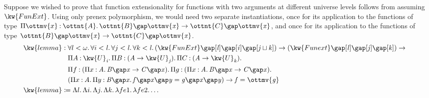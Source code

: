 \documentclass[a4paper,UKenglish,cleveref,autoref,thm-restate]{lipics-v2021}
\begin{document}
Suppose we wished to prove that function extensionality for
functions with two arguments at different universe levels follows from assuming $ \kw{ FunExt } $.
Using only prenex polymorphism, we would need two separate instantiations,
once for its application to the functions of type $ \Pi  \ottmv{x}  \mathbin{:}  \ottnt{A}  \mathpunct{.}     \ottnt{B}  \gap   \mathit{ \ottmv{x} }    \to  \ottnt{C}   \gap   \mathit{ \ottmv{x} }   $,
and once for its application to the functions of type $   \ottnt{B}  \gap   \mathit{ \ottmv{x} }    \to  \ottnt{C}   \gap   \mathit{ \ottmv{x} }  $.
%
\begin{align*}
   \kw{ lemma }  &:    \forall  l  <   \omega   \mathpunct{.}   \forall  i  <   \mathit{ l }   \mathpunct{.}   \forall  j  <   \mathit{ l }   \mathpunct{.}   \forall  k  <   \mathit{ l }   \mathpunct{.}   (     \kw{ FunExt }   \gap [   \mathit{ l }   ]   \gap [   \mathit{ i }   ]   \gap [    \mathit{ j }   \sqcup   \mathit{ k }    ]  )       \to   (     \kw{ Funext }   \gap [   \mathit{ l }   ]   \gap [   \mathit{ j }   ]   \gap [   \mathit{ k }   ]  )    \to   \relax   \\
  &\phantom{{} : {}}  \Pi  A  \mathbin{:}   \kw{U}_{  \mathit{ i }  }   \mathpunct{.}   \Pi  B  \mathbin{:}   (   \mathit{ A }   \to   \kw{U}_{  \mathit{ j }  }   )   \mathpunct{.}   \Pi  C  \mathbin{:}   (   \mathit{ A }   \to   \kw{U}_{  \mathit{ k }  }   )   \mathpunct{.}   \relax     \\
  &\phantom{{} : {}}  \Pi  f  \mathbin{:}   (     \Pi  x  \mathbin{:}   \mathit{ A }   \mathpunct{.}   \mathit{ B }    \gap   \mathit{ x }    \to   \mathit{ C }    \gap   \mathit{ x }   )   \mathpunct{.}   \Pi  g  \mathbin{:}   (     \Pi  x  \mathbin{:}   \mathit{ A }   \mathpunct{.}   \mathit{ B }    \gap   \mathit{ x }    \to   \mathit{ C }    \gap   \mathit{ x }   )   \mathpunct{.}   \relax    \\
  &\phantom{{} : {}}   (       \Pi  x  \mathbin{:}   \mathit{ A }   \mathpunct{.}   \Pi  y  \mathbin{:}    \mathit{ B }   \gap   \mathit{ x }    \mathpunct{.}   \mathit{ f }     \gap   \mathit{ x }    \gap   \mathit{ y }    =   \mathit{ g }    \gap   \mathit{ x }    \gap   \mathit{ y }   )   \to     \mathit{ f }   =   \mathit{ \ottmv{g} }     \\
   \kw{ lemma }  &\coloneqq  \Lambda  l  \mathpunct{.}   \Lambda  i  \mathpunct{.}   \Lambda  j  \mathpunct{.}   \Lambda  k  \mathpunct{.}   \lambda  fe1  \mathpunct{.}   \lambda  fe2  \mathpunct{.}   \relax        \dots
\end{align*}
\end{document}
